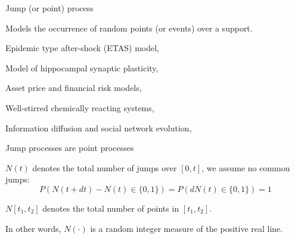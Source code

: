 \documentclass[
  ignorenonframetext,
  aspectratio=169,
  xcolor={dvipsnames,rgb}
]{beamer}
\begin{document}
\begin{frame}{Jump (or point) process}


Models the occurrence of random points (or events) over a support. 

\vspace{3em}

\begin{description}[labelwidth=2cm]
  \item[Seismology] Epidemic type after-shock (ETAS) model, \eg~\citet{saichev2007}
  \item[Neuroscience] Model of hippocampal synaptic plasticity, \eg~\citet{rodrigues2021}
  \item[Finance] Asset price and financial risk models, \eg~\citet{bjork2021}
  \item[Biochemistry] Well-stirred chemically reacting systems, \eg~\citet{gillespie2001}
  \item[Social Media] Information diffusion and social network evolution, \eg~\citet{farajtabar2017}
\end{description}

\end{frame}

\begin{frame}{Jump processes are point processes}


\( N (t) \) denotes the total number of jumps over \( [0, t] \), we assume no common jumps:
\[
  P(N(t + dt) - N(t) \in \{ 0, 1 \}) = P( dN(t) \in \{ 0, 1 \}) = 1
\]

\vspace{5em}

\( N[t_1, t_2] \) denotes the total number of points in \( [t_1, t_2] \). 

\vspace{1em}

In other words, \( N( \cdot ) \) is a random integer measure of the positive real line. 

\end{frame}




\end{document}
